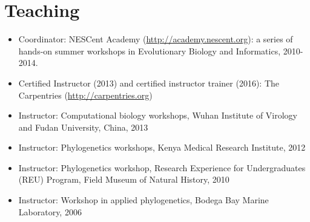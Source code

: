 \documentclass[10pt]{article}
\begin{document}
\section*{Teaching}
\begin{itemize}
\item{Coordinator: NESCent Academy (\url{http://academy.nescent.org}): a series of hands-on summer workshops in Evolutionary Biology and Informatics, 2010-2014.}
\item{Certified Instructor (2013) and certified instructor trainer (2016): The Carpentries (\url{http://carpentries.org})}
\item{Instructor: Computational biology workshops, Wuhan Institute of Virology and Fudan University, China, 2013}
\item{Instructor: Phylogenetics workshops, Kenya Medical Research Institute, 2012}
\item{Instructor: Phylogenetics workshop, Research Experience for Undergraduates (REU) Program, Field Museum of Natural History, 2010}
\item{Instructor: Workshop in applied phylogenetics, Bodega Bay Marine Laboratory, 2006}
\end{itemize}
\end{document}
